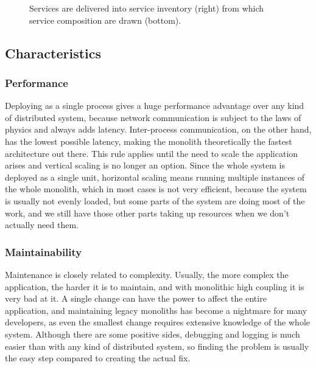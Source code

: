 \begin{figure}
    \centering
    
    \caption{Services are delivered into service inventory (right) from which service composition are drawn (bottom). \label{img:soa_architecture}}
\end{figure}


\newpage
\subsection{Characteristics}

\subsubsection{Performance}
\label{section:monolith:performance}
Deploying as a single process gives a huge performance advantage over any kind of distributed system, because network communication is subject to the laws of physics and always adds latency. Inter-process communication, on the other hand, has the lowest possible latency, making the monolith theoretically the fastest architecture out there. This rule applies until the need to scale the application arises and vertical scaling is no longer an option. Since the whole system is deployed as a single unit, horizontal scaling means running multiple instances of the whole monolith, which in most cases is not very efficient, because the system is usually not evenly loaded, but some parts of the system are doing most of the work, and we still have those other parts taking up resources when we don't actually need them.


% 

\subsubsection{Maintainability}
Maintenance is closely related to complexity. Usually, the more complex the application, the harder it is to maintain, and with monolithic high coupling it is very bad at it. A single change can have the power to affect the entire application, and maintaining legacy monoliths has become a nightmare for many developers, as even the smallest change requires extensive knowledge of the whole system. Although there are some positive sides, debugging and logging is much easier than with any kind of distributed system, so finding the problem is usually the easy step compared to creating the actual fix.

